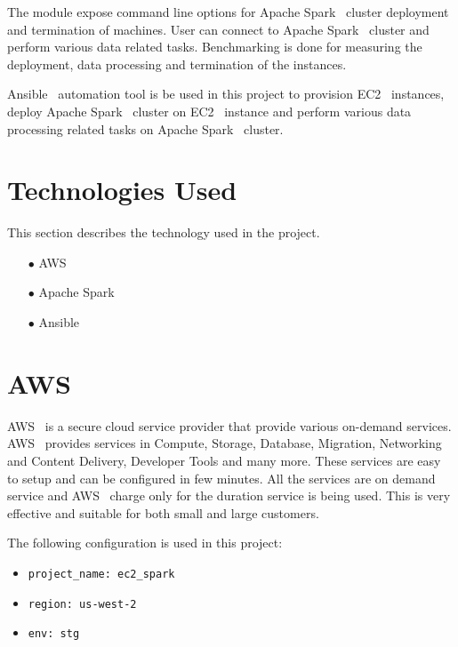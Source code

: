 The module expose command line
options for Apache Spark~\cite{hid-sp18-511-www-spark} cluster
deployment and termination of
machines. User can connect to Apache Spark~\cite{hid-sp18-511-www-spark} cluster and perform various data related tasks. Benchmarking is done for measuring the deployment, data processing and termination of the instances.

Ansible~\cite{hid-sp18-511-www-ansible} automation tool is be used in
this project to provision EC2~\cite{hid-sp18-511-www-ec2} instances,
deploy Apache Spark~\cite{hid-sp18-511-www-spark} cluster on
EC2~\cite{hid-sp18-511-www-ec2} instance and perform various data
processing related tasks on Apache Spark~\cite{hid-sp18-511-www-spark}
cluster.

\section{Technologies Used}
This section describes the technology used in the project.

\begin{itemize}
	\item[$\bullet$] AWS 
	\item[$\bullet$] Apache Spark 
	\item[$\bullet$] Ansible
\end{itemize}

\section{AWS}

AWS~\cite{hid-sp18-511-www-aws} is a secure cloud service provider
that provide various on-demand services.
AWS~\cite{hid-sp18-511-www-aws} provides services in Compute, Storage,
Database, Migration, Networking and Content Delivery, Developer Tools
and many more. These services are easy to setup and can be configured in few
minutes. All the services are on demand service and
AWS~\cite{hid-sp18-511-www-aws} charge only for the duration service is
being used. This is very effective and suitable for both small and
large customers.

The following configuration is used in this project:

\begin{itemize}
	\item \verb|project_name: ec2_spark|
	\item \verb|region: us-west-2|
	\item \verb|env: stg|
\end{itemize}


